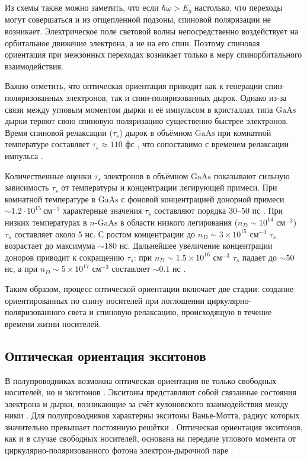 \documentclass[14pt]{extarticle}
\newcommand{\gaas}{\mathrm{Ga}\mathrm{As}}
\numberwithin{equation}{section}
\begin{document}
Из схемы также можно заметить, что если $\hbar \omega > E_g$ настолько, что переходы могут совершаться и из отщепленной подзоны, спиновой поляризации не возникает. Электрическое поле световой волны непосредственно воздействует на орбитальное движение электрона, а не на его спин. Поэтому спиновая ориентация при межзонных переходах возникает только в меру спинорбитального взаимодействия.

Важно отметить, что оптическая ориентация приводит как к генерации спин-поляризованных электронов, так и спин-поляризованных дырок. Однако из-за связи между угловым моментом дырки и её импульсом в кристаллах типа $\gaas$ дырки теряют свою спиновую поляризацию существенно быстрее электронов. Время спиновой релаксации ($\tau_s$) дырок в объёмном $\gaas$ при комнатной температуре составляет  $ \tau_s \approx 110$ фс \cite{Hilton2001}, что сопоставимо с временем релаксации импульса \cite{zakharchenya_opt_or}.

Количественные оценки $\tau_s$ электронов в объёмном $\gaas$ показывают сильную зависимость $\tau_s$ от температуры и концентрации легирующей примеси.  При комнатной температуре в $\gaas$ с фоновой концентрацией донорной примеси $\sim 1.2 \cdot 10^{15}~ \text{см}^{-3}$  характерные значения $\tau_s$ составляют порядка $30–50$ пс \cite{Oertel2008}. При низких температурах в $n$-$\gaas$  в области низкого легирования ($n_D \sim 10^{14}$ см$^{-3}$)~ $\tau_s$ составляет около 5 нс. С ростом концентрации до $n_D \sim 3 \times 10^{15}$ см$^{-3}$ $\tau_s$ возрастает до максимума $\sim 180$ нс. Дальнейшее увеличение концентрации доноров приводит к сокращению $\tau_s$: при $n_D\sim 1.5 \times 10^{16}$ см$^{-3}$ $\tau_s$ падает до $\sim 50$ нс, а при $n_D \sim 5 \times 10^{17}$ см$^{-3}$ составляет $\sim 0.1$ нс \cite{Dzhioev_Kavokin}.

Таким образом, процесс оптической ориентации включает две стадии: создание ориентированных по спину носителей при поглощении циркулярно-поляризованного света и спиновую релаксацию, происходящую в течение времени жизни носителей. 


\subsection{Оптическая ориентация экситонов}

В полупроводниках возможна оптическая ориентация не только свободных носителей, но и экситонов \cite{zakharchenya_opt_or}. Экситоны представляют собой связанные состояния электрона и дырки, возникающие за счёт кулоновского взаимодействия между ними \cite{Piter}. Для полупроводников характерны экситоны Ванье-Мотта, радиус которых значительно превышает постоянную решётки \cite{Piter,Wanier,mott}. Оптическая ориентация экситонов, как и в случае свободных носителей, основана на передаче углового момента от циркулярно-поляризованного фотона электрон-дырочной паре \cite{zakharchenya_opt_or, Bonnot}.
\end{document}
